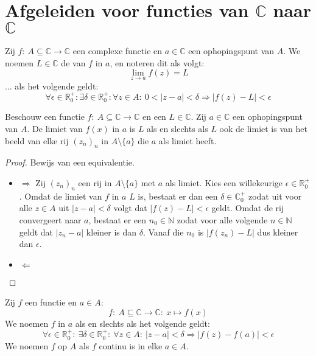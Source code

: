 \documentclass[main.tex]{subfiles}
\begin{document}
\section{Afgeleiden voor functies van $\mathbb{C}$ naar $\mathbb{C}$}
\label{sec:afgel-voor-funct}

\begin{de}
  Zij $f:\ A \subseteq \mathbb{C} \rightarrow \mathbb{C}$ een complexe functie en $a \in \mathbb{C}$ een ophopingspunt van $A$.
  We noemen $L\in \mathbb{C}$ de  van $f$ in $a$, en noteren dit als volgt:
  \[ \lim_{z \rightarrow a}f(z) = L \]
  ... als het volgende geldt:
  \[ \forall \epsilon \in \mathbb{R}_{0}^{+}: \exists \delta \in \mathbb{R}_{0}^{+}: \forall z\in A:\ 0 < |z-a| < \delta \Rightarrow |f(z) - L| < \epsilon \]
\end{de}

\begin{pr}
  \label{pr:limiet-van-functie-asa-limiet-van-beeld-van-rij-in-c}
  Beschouw een functie $f:\ A \subseteq \mathbb{C} \rightarrow \mathbb{C}$ en een $L \in \mathbb{C}$.
  Zij $a \in \mathbb{C}$ een ophopingspunt van $A$.
  De limiet van $f(x)$ in $a$ is $L$ als en slechts als $L$ ook de limiet is van het beeld van elke rij $(z_{n})_{n}$ in $A\setminus\{a\}$ die $a$ als limiet heeft.

  \begin{proof}
    Bewijs van een equivalentie.
    \begin{itemize}
    \item $\Rightarrow$
      Zij $(z_{n})_{n}$ een rij in $A\setminus \{a\}$ met $a$ als limiet.
      Kies een willekeurige $\epsilon \in \mathbb{R}_{0}^{+}$.
      Omdat de limiet van $f$ in $a$ $L$ is, bestaat er dan een $\delta \in \mathbb{C}_{0}^{+}$ zodat uit voor alle $z\in A$ uit $|z-a|<\delta$ volgt dat $|f(z)-L|<\epsilon$ geldt.
      Omdat de rij convergeert naar $a$, bestaat er een $n_{0}\in \mathbb{N}$ zodat voor alle volgende $n\in\mathbb{N}$ geldt dat $|z_{n}-a|$ kleiner is dan $\delta$.
      Vanaf die $n_{0}$ is $|f(z_{n})-L|$ dus kleiner dan $\epsilon$.
    \item $\Leftarrow$
    \end{itemize}
  \end{proof}
\end{pr}


\begin{de}
  Zij $f$ een functie en $a\in A$:
  \[ f:\ A \subseteq \mathbb{C} \rightarrow \mathbb{C}:\ x \mapsto f(x) \]
  We noemen $f$  in $a$ als en slechts als het volgende geldt:
  \[ \forall \epsilon \in \mathbb{R}_{0}^{+}:\ \exists \delta \in \mathbb{R}_{0}^{+}:\ \forall z\in A:\ |z-a| < \delta \Rightarrow |f(z) -f(a)| < \epsilon \]
  We noemen $f$  op $A$ als $f$ continu is in elke $a\in A$.
\end{de}
\end{document}
